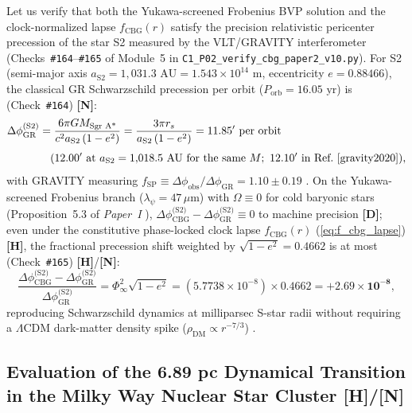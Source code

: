\documentclass[11pt,a4paper]{article}
\newcommand{\catD}{\textbf{\textcolor{blue!75!black}{[D]}}}
\newcommand{\catH}{\textbf{\textcolor{orange!85!black}{[H]}}}
\newcommand{\catN}{\textbf{\textcolor{teal!75!black}{[N]}}}
\theoremstyle{plain}
\theoremstyle{definition}
\theoremstyle{remark}
\numberwithin{equation}{section}
\begin{document}
Let us verify that both the Yukawa-screened Frobenius BVP solution and the clock-normalized lapse $f_{\text{CBG}}(r)$ satisfy the precision relativistic pericenter precession of the star S2 measured by the VLT/GRAVITY interferometer \cite{gravity2020} (Checks~\texttt{\#164}--\texttt{\#165} of Module~5 in \allowbreak\texttt{C1\_P02\_verify\_cbg\_paper2\_v10.py}). For S2 (semi-major axis $a_{\text{S2}} = 1{,}031.3\text{ AU} = 1.543 \times 10^{14}\text{ m}$, eccentricity $e = 0.88466$), the classical GR Schwarzschild precession per orbit ($P_{\text{orb}} = 16.05\text{ yr}$) is (Check~\texttt{\#164}) \catN:
\begin{align}
\Delta\phi_{\text{GR}}^{\text{(S2)}} &= \frac{6\pi GM_{\text{Sgr A*}}}{c^2 a_{\text{S2}}\left(1 - e^2\right)} = \frac{3\pi r_s}{a_{\text{S2}}\left(1 - e^2\right)} = 11.85'\text{ per orbit} \nonumber \\[3pt] &\quad (12.00'\text{ at } a_{\text{S2}} = 1{,}018.5\text{ AU for the same } M;\ 12.10'\text{ in Ref.~\cite{gravity2020}}),
\label{eq:s2_gr_precession}
\end{align}
with GRAVITY measuring $f_{\text{SP}} \equiv \Delta\phi_{\text{obs}} / \Delta\phi_{\text{GR}} = 1.10 \pm 0.19$ \cite{gravity2020}. On the Yukawa-screened Frobenius branch ($\lambda_{\psi} = 47\,\mu\text{m}$) with $\Omega \equiv 0$ for cold baryonic stars (Proposition~5.3 of \textit{Paper~I} \cite{jimenez2026a}), $\Delta\phi_{\text{CBG}}^{\text{(S2)}} - \Delta\phi_{\text{GR}}^{\text{(S2)}} \equiv 0$ to machine precision \catD; even under the constitutive phase-locked clock lapse $f_{\text{CBG}}(r)$ (\ref{eq:f_cbg_lapse}) \catH, the fractional precession shift weighted by $\sqrt{1 - e^2} = 0.4662$ is at most (Check~\texttt{\#165}) \catH/\catN:
\begin{equation}
\frac{\Delta\phi_{\text{CBG}}^{\text{(S2)}} - \Delta\phi_{\text{GR}}^{\text{(S2)}}}{\Delta\phi_{\text{GR}}^{\text{(S2)}}} = \Phi_{\infty}^2 \sqrt{1 - e^2} = \left(5.7738 \times 10^{-8}\right) \times 0.4662 = \mathbf{+2.69 \times 10^{-8}},
\label{eq:s2_cbg_precession_shift}
\end{equation}
reproducing Schwarzschild dynamics at milliparsec S-star radii without requiring a $\Lambda\text{CDM}$ dark-matter density spike ($\rho_{\text{DM}} \propto r^{-7/3}$) \cite{gondolo1999,gravity2020}.

\subsection{\texorpdfstring{Evaluation of the 6.89 pc Dynamical Transition in the Milky Way Nuclear Star Cluster \catH/\catN}{Evaluation of the 6.89 pc Dynamical Transition in the Milky Way Nuclear Star Cluster}}
\end{document}
